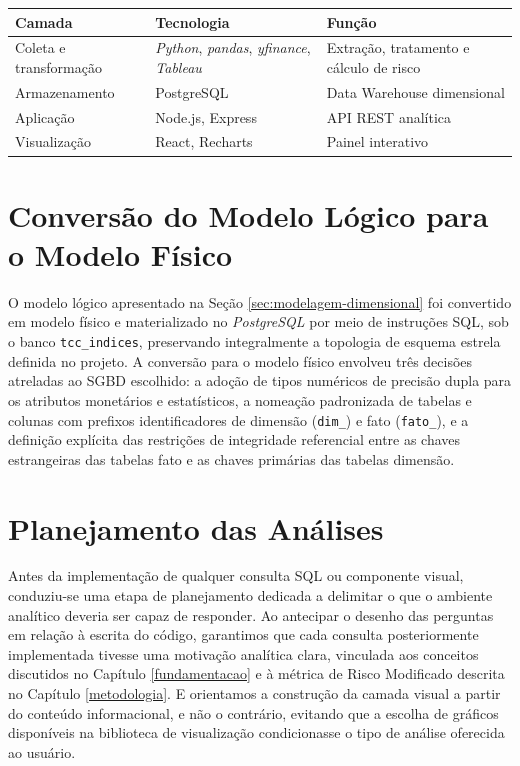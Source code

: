 \begin{quadro}[ht]
\centering
\caption{Componentes da stack tecnológica do ambiente analítico}
\label{tab:stack}
\begin{tabular}{|p{4.5cm}|p{4.5cm}|p{5cm}|}
\hline
\textbf{Camada} & \textbf{Tecnologia} & \textbf{Função} \\ \hline
Coleta e transformação & \textit{Python}, \textit{pandas}, \textit{yfinance}, \textit{Tableau} & Extração, tratamento e cálculo de risco \\ \hline
Armazenamento & PostgreSQL & Data Warehouse dimensional \\ \hline
Aplicação & Node.js, Express & API REST analítica \\ \hline
Visualização & React, Recharts & Painel interativo \\ \hline
\end{tabular}
\end{quadro}

\section{Conversão do Modelo Lógico para o Modelo Físico}
\label{sec:arquitetura-dw}

O modelo lógico apresentado na Seção \ref{sec:modelagem-dimensional} foi convertido em modelo físico e materializado no \textit{PostgreSQL} por meio de instruções SQL, sob o banco \texttt{tcc\_indices}, preservando integralmente a topologia de esquema estrela definida no projeto. A conversão para o modelo físico envolveu três decisões atreladas ao SGBD escolhido: a adoção de tipos numéricos de precisão dupla para os atributos monetários e estatísticos, a nomeação padronizada de tabelas e colunas com prefixos identificadores de dimensão (\texttt{dim\_}) e fato (\texttt{fato\_}), e a definição explícita das restrições de integridade referencial entre as chaves estrangeiras das tabelas fato e as chaves primárias das tabelas dimensão.

\section{Planejamento das Análises}
\label{sec:planejamentoconsultas}

Antes da implementação de qualquer consulta SQL ou componente visual, conduziu-se uma etapa de planejamento dedicada a delimitar o que o ambiente analítico deveria ser capaz de responder. Ao antecipar o desenho das perguntas em relação à escrita do código, garantimos que cada consulta posteriormente implementada tivesse uma motivação analítica clara, vinculada aos conceitos discutidos no Capítulo \ref{fundamentacao} e à métrica de Risco Modificado descrita no Capítulo \ref{metodologia}. E orientamos a construção da camada visual a partir do conteúdo informacional, e não o contrário, evitando que a escolha de gráficos disponíveis na biblioteca de visualização condicionasse o tipo de análise oferecida ao usuário.

